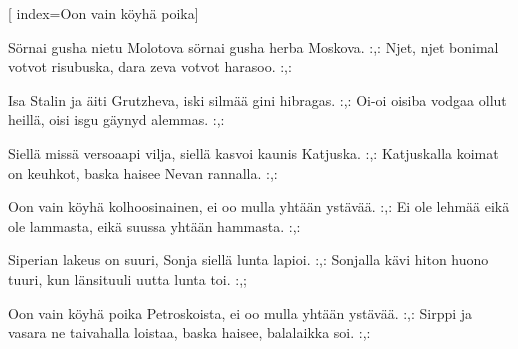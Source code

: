 [ 										
	index={Oon vain köyhä poika}]		
	
\beginverse*						
Sörnai gusha nietu Molotova
sörnai gusha herba Moskova.
:,: Njet, njet bonimal votvot risubuska,
dara zeva votvot harasoo. :,:
\endverse

\beginverse				
Isa Stalin ja äiti Grutzheva,
iski silmää gini hibragas.
:,: Oi-oi oisiba vodgaa ollut heillä,
oisi isgu gäynyd alemmas. :,:
\endverse

\beginverse
Siellä missä versoaapi vilja, 
siellä kasvoi kaunis Katjuska.
:,: Katjuskalla koimat on keuhkot,
baska haisee Nevan rannalla. :,:
\endverse

\beginverse
Oon vain köyhä kolhoosinainen,
ei oo mulla yhtään ystävää.
:,: Ei ole lehmää eikä ole lammasta,
eikä suussa yhtään hammasta. :,:
\endverse

\beginverse
Siperian lakeus on suuri,
Sonja siellä lunta lapioi.
:,: Sonjalla kävi hiton huono tuuri,
kun länsituuli uutta lunta toi. :,;
\endverse

\beginverse
Oon vain köyhä poika Petroskoista,
ei oo mulla yhtään ystävää. 
:,: Sirppi ja vasara ne taivahalla loistaa,
baska haisee, balalaikka soi. :,:
\endverse		
\endsong		
